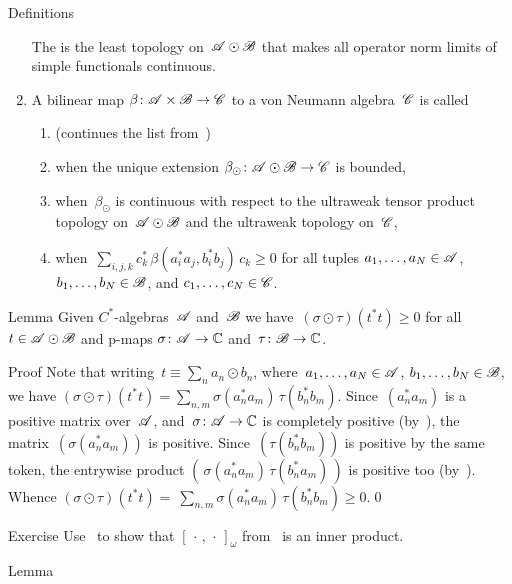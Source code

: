 \documentclass[a]{subfiles}
\begin{document}
\begin{parsec}
\begin{point}{Definitions}
\begin{enumerate}
The 
is the least topology on~$\mathscr{A}\odot\mathscr{B}$
that makes all operator norm limits
of simple functionals continuous.
\item
A bilinear map $\beta\colon \mathscr{A}\times \mathscr{B}\to\mathscr{C}$
to a von Neumann algebra~$\mathscr{C}$
is called
\begin{enumerate}
\item
(continues the list from~)
\item
{}
when the unique extension $\beta_\odot \colon \mathscr{A}\odot \mathscr{B}\to \mathscr{C}$
is bounded,
\item 
{}
when~$\beta_\odot$
is continuous with respect to the ultraweak tensor product topology 
on~$\mathscr{A}\odot\mathscr{B}$
and the ultraweak topology on~$\mathscr{C}$,
\item
{}
when~$\sum_{i,j,k}c_k^*\,\beta(a_i^*a_j,b_i^*b_j)\,c_k\geq 0$
for all tuples $a_1,\dotsc,a_N\in\mathscr{A}$,
$b_1,\dotsc,b_N\in\mathscr{B}$,
and $c_1,\dotsc,c_N\in\mathscr{C}$.
\end{enumerate}
\end{enumerate}
\end{point}
\begin{point}{Lemma}%
Given $C^*$-algebras~$\mathscr{A}$ and~$\mathscr{B}$
we have~$(\sigma\odot \tau) (t^*t)\geq 0$
for all  $t\in\mathscr{A}\odot\mathscr{B}$
and p-maps  $\sigma\colon \mathscr{A}\to\mathbb{C}$
and~$\tau\colon \mathscr{B}\to\mathbb{C}$.
\begin{point}{Proof}%
Note that writing~$t\equiv \sum_n a_n \odot b_n$,
where~$a_1,\dotsc,a_N\in \mathscr{A}$, $b_1,\dotsc,b_N\in \mathscr{B}$,
we have
$(\sigma\odot\tau)(t^*t)
= \sum_{n,m} \sigma(a_n^*a_m)\,\tau(b_n^*b_m)$.
Since~$(a_n^*a_m)$
is a positive matrix over~$\mathscr{A}$,
and~$\sigma\colon \mathscr{A}\to\mathbb{C}$
is completely positive (by~),
the matrix~$(\sigma(a_n^*a_m))$ is positive.
Since~$(\tau(b_n^*b_m))$
is positive by the same token,
the entrywise product
$(\,\sigma(a_n^*a_m)\,\tau(b_n^*a_m)\,)$
is positive too (by~).
Whence
$(\sigma\odot\tau)(t^*t)
=\ \sum_{n,m} \sigma(a_n^*a_m)\,\tau(b_n^*b_m) \geq 0$.\qed
\end{point}
\end{point}
\begin{point}{Exercise}%
Use~ 
to show that
 $[\,\cdot\,,\,\cdot\,]_\omega$
from~
is an inner product.
\end{point}
\begin{point}{Lemma}%

\end{point}
\end{parsec}
\end{document}
